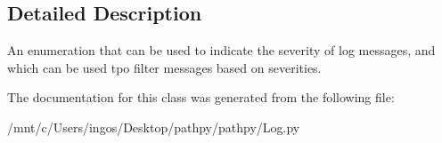 \subsection{Detailed Description}
\begin{DoxyVerb}An enumeration that can be used to indicate 
    the severity of log messages, and which can be 
    used tpo filter messages based on severities.
\end{DoxyVerb}
 

The documentation for this class was generated from the following file\-:\begin{DoxyCompactItemize}
\item 
/mnt/c/\-Users/ingos/\-Desktop/pathpy/pathpy/Log.\-py\end{DoxyCompactItemize}
